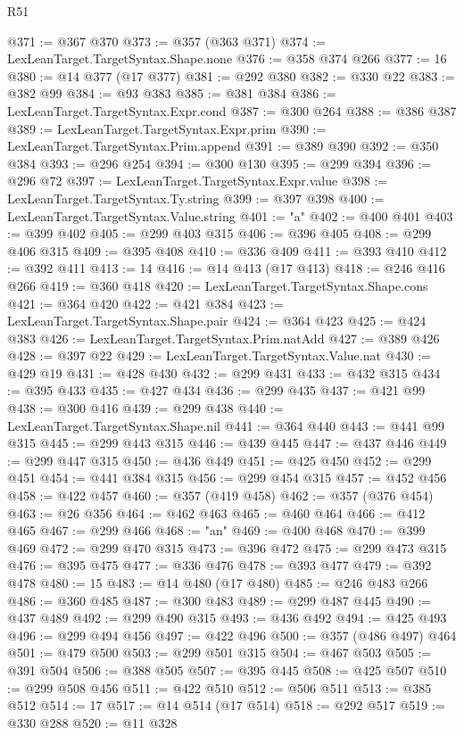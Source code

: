 \begin{lexlean}{R51}
\begin{coremodule}
@371 := @367 @370
@373 := @357 (@363 @371)
@374 := LexLeanTarget.TargetSyntax.Shape.none
@376 := @358 @374 @266
@377 := 16
@380 := @14 @377 (@17 @377)
@381 := @292 @380
@382 := @330 @22
@383 := @382 @99
@384 := @93 @383
@385 := @381 @384
@386 := LexLeanTarget.TargetSyntax.Expr.cond
@387 := @300 @264
@388 := @386 @387
@389 := LexLeanTarget.TargetSyntax.Expr.prim
@390 := LexLeanTarget.TargetSyntax.Prim.append
@391 := @389 @390
@392 := @350 @384
@393 := @296 @254
@394 := @300 @130
@395 := @299 @394
@396 := @296 @72
@397 := LexLeanTarget.TargetSyntax.Expr.value
@398 := LexLeanTarget.TargetSyntax.Ty.string
@399 := @397 @398
@400 := LexLeanTarget.TargetSyntax.Value.string
@401 := "a"
@402 := @400 @401
@403 := @399 @402
@405 := @299 @403 @315
@406 := @396 @405
@408 := @299 @406 @315
@409 := @395 @408
@410 := @336 @409
@411 := @393 @410
@412 := @392 @411
@413 := 14
@416 := @14 @413 (@17 @413)
@418 := @246 @416 @266
@419 := @360 @418
@420 := LexLeanTarget.TargetSyntax.Shape.cons
@421 := @364 @420
@422 := @421 @384
@423 := LexLeanTarget.TargetSyntax.Shape.pair
@424 := @364 @423
@425 := @424 @383
@426 := LexLeanTarget.TargetSyntax.Prim.natAdd
@427 := @389 @426
@428 := @397 @22
@429 := LexLeanTarget.TargetSyntax.Value.nat
@430 := @429 @19
@431 := @428 @430
@432 := @299 @431
@433 := @432 @315
@434 := @395 @433
@435 := @427 @434
@436 := @299 @435
@437 := @421 @99
@438 := @300 @416
@439 := @299 @438
@440 := LexLeanTarget.TargetSyntax.Shape.nil
@441 := @364 @440
@443 := @441 @99 @315
@445 := @299 @443 @315
@446 := @439 @445
@447 := @437 @446
@449 := @299 @447 @315
@450 := @436 @449
@451 := @425 @450
@452 := @299 @451
@454 := @441 @384 @315
@456 := @299 @454 @315
@457 := @452 @456
@458 := @422 @457
@460 := @357 (@419 @458)
@462 := @357 (@376 @454)
@463 := @26 @356
@464 := @462 @463
@465 := @460 @464
@466 := @412 @465
@467 := @299 @466
@468 := "an"
@469 := @400 @468
@470 := @399 @469
@472 := @299 @470 @315
@473 := @396 @472
@475 := @299 @473 @315
@476 := @395 @475
@477 := @336 @476
@478 := @393 @477
@479 := @392 @478
@480 := 15
@483 := @14 @480 (@17 @480)
@485 := @246 @483 @266
@486 := @360 @485
@487 := @300 @483
@489 := @299 @487 @445
@490 := @437 @489
@492 := @299 @490 @315
@493 := @436 @492
@494 := @425 @493
@496 := @299 @494 @456
@497 := @422 @496
@500 := @357 (@486 @497) @464
@501 := @479 @500
@503 := @299 @501 @315
@504 := @467 @503
@505 := @391 @504
@506 := @388 @505
@507 := @395 @445
@508 := @425 @507
@510 := @299 @508 @456
@511 := @422 @510
@512 := @506 @511
@513 := @385 @512
@514 := 17
@517 := @14 @514 (@17 @514)
@518 := @292 @517
@519 := @330 @288
@520 := @11 @328

\end{coremodule}
\end{lexlean}
